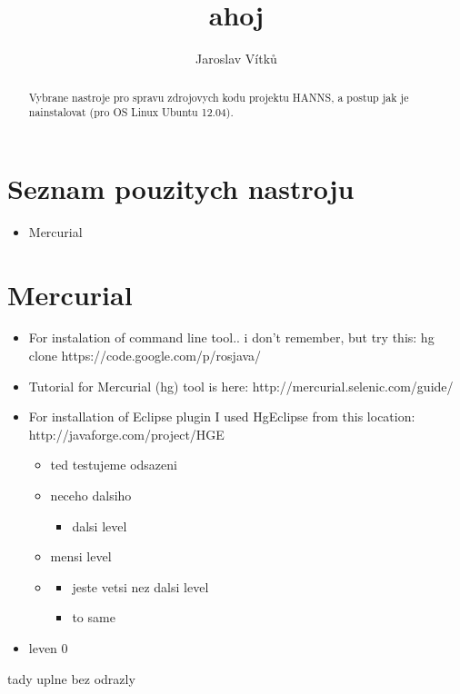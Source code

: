 \documentclass[journal,onecolumn]{IEEEtrancz}
\begin{document}
\title{ahoj}
\author{Jaroslav Vítků}

\maketitle

\begin{abstract}
Vybrane nastroje pro spravu zdrojovych kodu projektu HANNS, a postup jak je nainstalovat (pro OS Linux Ubuntu 12.04).
\end{abstract}

\IEEEpeerreviewmaketitle



\section{Seznam pouzitych nastroju}


\begin{itemize}
	\item Mercurial


\end{itemize}
\section{Mercurial}


\begin{itemize}
	\item For instalation of command line tool.. i don't remember, but try this: hg clone https://code.google.com/p/rosjava/ 
	\item Tutorial for Mercurial (hg) tool is here: http://mercurial.selenic.com/guide/
		\vspace{3mm}
	\item For installation of Eclipse plugin I used HgEclipse from this location: http://javaforge.com/project/HGE
	\begin{itemize}
		\item ted testujeme odsazeni
		\item neceho dalsiho
		\begin{itemize}
			\item dalsi level
		\end{itemize}

		\item mensi level
			\item 
\begin{itemize}
			\begin{itemize}
				\item jeste vetsi nez dalsi level
				\item to same
			\end{itemize}

		\end{itemize}

	\end{itemize}

	\item leven 0
\end{itemize}
tady uplne bez odrazly
\end{document}

